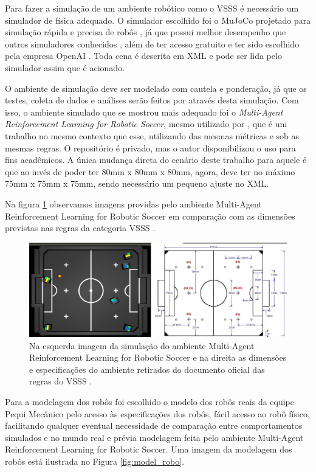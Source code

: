 Para fazer a simulação de um ambiente robótico como o VSSS é necessário um simulador de física adequado. O simulador escolhido foi o MuJoCo projetado para simulação rápida e precisa de robôs \cite{46_mujoco}, já que possui melhor desempenho que outros simuladores conhecidos \cite{44_comparacao_mujoco}, além de ter acesso gratuito e ter sido escolhido pela empresa OpenAI \cite{5_openai_gym}. Toda cena é descrita em XML e pode ser lida pelo simulador assim que é acionado.

O ambiente de simulação deve ser modelado com cautela e ponderação, já que os testes, coleta de dados e análises serão feitos por através desta simulação. Com isso, o ambiente simulado que se mostrou mais adequado foi o \textit{Multi-Agent Reinforcement Learning for Robotic Soccer}, mesmo utilizado por \cite{bruno_brandao}, que é um trabalho no mesmo contexto que esse, utilizando das mesmas métricas e sob as mesmas regras. O repositório é privado, mas o autor disponibilizou o uso para fins acadêmicos. A única mudança direta do cenário deste trabalho para aquele é que ao invés de poder ter 80mm x 80mm x 80mm, agora, deve ter no máximo 75mm x 75mm x 75mm, sendo necessário um pequeno ajuste no XML.

Na figura \ref{fig:simu_regra} observamos imagens providas pelo ambiente Multi-Agent Reinforcement Learning for Robotic Soccer em comparação com as dimensões previstas nas regras da categoria VSSS \cite{regras_vss2023}.

    \begin{figure}[H]
     \centering
     \includegraphics[width=1\textwidth]{./fig/simu_regra.png}
    
     \caption{Na esquerda imagem da simulação do ambiente Multi-Agent Reinforcement Learning for Robotic Soccer e na direita as dimensões e especificações do ambiente retirados do documento oficial das regras do VSSS \cite{regras_vss2023}.}
     \label{fig:simu_regra}
    \end{figure}


Para a modelagem dos robôs foi escolhido o modelo dos robôs reais da equipe Pequi Mecânico pelo acesso às especificações dos robôs, fácil acesso ao robô físico, facilitando qualquer eventual necessidade de comparação entre comportamentos simulados e no mundo real e prévia modelagem feita pelo ambiente Multi-Agent Reinforcement Learning for Robotic Soccer. Uma imagem da modelagem dos robôs está ilustrada no Figura \ref{fig:model_robo}.

